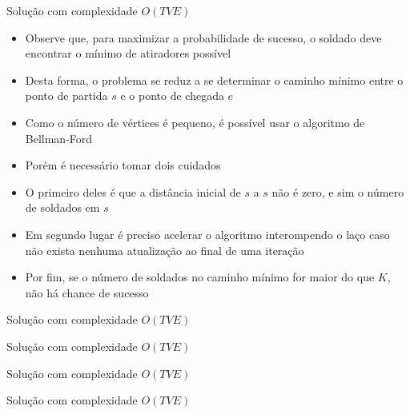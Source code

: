 \begin{frame}[fragile]{Solução com complexidade $O(TVE)$}

    \begin{itemize}
        \item Observe que, para maximizar a probabilidade de sucesso, o soldado deve encontrar
            o mínimo de atiradores possível

        \item Desta forma, o problema se reduz a se determinar o caminho mínimo entre o ponto de
            partida $s$ e o ponto de chegada $e$

        \item Como o número de vértices é pequeno, é possível usar o algoritmo de Bellman-Ford

        \item Porém é necessário tomar dois cuidados

        \item O primeiro deles é que a distância inicial de $s$ a $s$ não é zero, e sim o número
            de soldados em $s$

        \item Em segundo lugar é preciso acelerar o algoritmo interompendo o laço caso não 
            exista nenhuma atualização ao final de uma iteração

        \item Por fim, se o número de soldados no caminho mínimo for maior do que $K$, não
            há chance de sucesso
   \end{itemize}

\end{frame}

\begin{frame}[fragile]{Solução com complexidade $O(TVE)$}
\end{frame}

\begin{frame}[fragile]{Solução com complexidade $O(TVE)$}
\end{frame}

\begin{frame}[fragile]{Solução com complexidade $O(TVE)$}
\end{frame}

\begin{frame}[fragile]{Solução com complexidade $O(TVE)$}
\end{frame}

